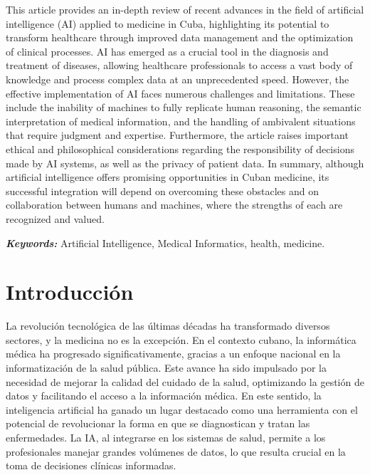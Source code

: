 \documentclass[a4paper,10pt]{article}
\renewenvironment{abstract}
 {\small
  \begin{center}
  \bfseries \abstractname\vspace{-.5em}\vspace{0pt}
  \end{center}
  \list{}{%
    \setlength{\leftmargin}{4mm}%
    \setlength{\rightmargin}{\leftmargin}%
  }%
  \item\relax}
 {\endlist}
\providecommand{\keywords}[2]
{
  \hfill \break
  \small	
  \textbf{\textit{#1:}} #2
}
\begin{document}
\begin{abstract}
This article provides an in-depth review of recent advances in the field of artificial intelligence (AI) applied to medicine in Cuba, highlighting its potential to transform healthcare through improved data management and the optimization of clinical processes. AI has emerged as a crucial tool in the diagnosis and treatment of diseases, allowing healthcare professionals to access a vast body of knowledge and process complex data at an unprecedented speed. However, the effective implementation of AI faces numerous challenges and limitations. These include the inability of machines to fully replicate human reasoning, the semantic interpretation of medical information, and the handling of ambivalent situations that require judgment and expertise. Furthermore, the article raises important ethical and philosophical considerations regarding the responsibility of decisions made by AI systems, as well as the privacy of patient data. In summary, although artificial intelligence offers promising opportunities in Cuban medicine, its successful integration will depend on overcoming these obstacles and on collaboration between humans and machines, where the strengths of each are recognized and valued.

\keywords{Keywords}{Artificial Intelligence, Medical Informatics, health, medicine.}
\end{abstract} 

\section{Introducción}
La revolución tecnológica de las últimas décadas ha transformado diversos sectores, y la medicina no es la excepción. En el contexto cubano, la informática médica ha progresado significativamente, gracias a un enfoque nacional en la informatización de la salud pública. Este avance ha sido impulsado por la necesidad de mejorar la calidad del cuidado de la salud, optimizando la gestión de datos y facilitando el acceso a la información médica. En este sentido, la inteligencia artificial ha ganado un lugar destacado como una herramienta con el potencial de revolucionar la forma en que se diagnostican y tratan las enfermedades. La IA, al integrarse en los sistemas de salud, permite a los profesionales manejar grandes volúmenes de datos, lo que resulta crucial en la toma de decisiones clínicas informadas.\vspace{1cm}
\end{document}
